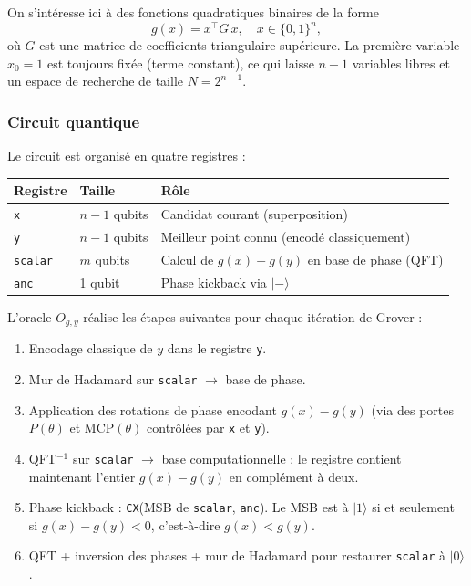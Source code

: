 \documentclass{ceri/sty/rapport}
\begin{document}
On s'intéresse ici à des fonctions quadratiques binaires de la forme
\[
  g(x) = x^\top G\, x, \quad x \in \{0,1\}^n,
\]
où $G$ est une matrice de coefficients triangulaire supérieure. La première variable
$x_0 = 1$ est toujours fixée (terme constant), ce qui laisse $n-1$ variables libres et
un espace de recherche de taille $N = 2^{n-1}$.

\subsubsection{Circuit quantique}

Le circuit est organisé en quatre registres :

\begin{center}
\begin{tabular}{lll}
\toprule
Registre & Taille & Rôle \\
\midrule
\texttt{x} & $n-1$ qubits & Candidat courant (superposition) \\
\texttt{y} & $n-1$ qubits & Meilleur point connu (encodé classiquement) \\
\texttt{scalar} & $m$ qubits & Calcul de $g(x)-g(y)$ en base de phase (QFT) \\
\texttt{anc} & 1 qubit & Phase kickback via $|{-}\rangle$ \\
\bottomrule
\end{tabular}
\end{center}

L'oracle $O_{g,y}$ réalise les étapes suivantes pour chaque itération de Grover :
\begin{enumerate}
  \item Encodage classique de $y$ dans le registre \texttt{y}.
  \item Mur de Hadamard sur \texttt{scalar} $\to$ base de phase.
  \item Application des rotations de phase encodant $g(x) - g(y)$ (via des portes
        $P(\theta)$ et $\mathrm{MCP}(\theta)$ contrôlées par \texttt{x} et \texttt{y}).
  \item QFT$^{-1}$ sur \texttt{scalar} $\to$ base computationnelle ; le registre contient
        maintenant l'entier $g(x)-g(y)$ en complément à deux.
  \item Phase kickback : \texttt{CX}(MSB de \texttt{scalar}, \texttt{anc}). Le MSB est
        à $|1\rangle$ si et seulement si $g(x)-g(y) < 0$, c'est-à-dire $g(x) < g(y)$.
  \item QFT + inversion des phases + mur de Hadamard pour restaurer \texttt{scalar} à $|0\rangle$.
\end{enumerate}
\end{document}
